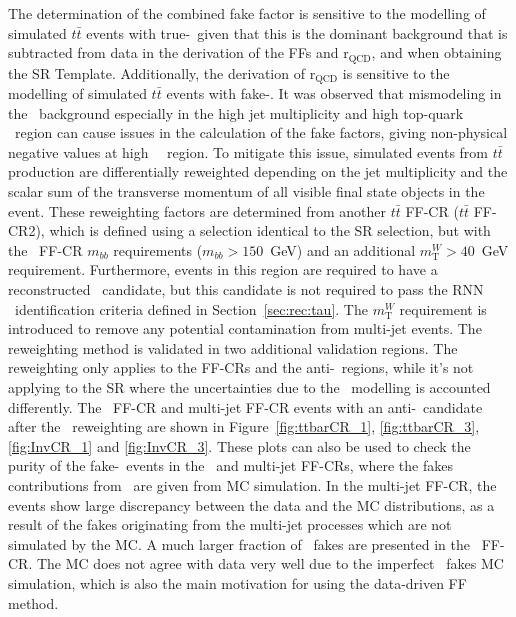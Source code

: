 The determination of the combined fake factor 
is sensitive to the modelling of simulated $t\bar{t}$ events with true-\tauhad\
given that this is the dominant background that is subtracted from data in the derivation of
the FFs and $\mathrm{r}_\text{QCD}$, and when obtaining the SR Template. Additionally, the derivation
of $\mathrm{r}_\text{QCD}$ is sensitive to the modelling of simulated $t\bar{t}$ events with fake-\tauhad.
It was observed that mismodeling in the \ttbar\ background 
especially in the high jet multiplicity and high top-quark \pt\ region
can cause issues in the calculation of the fake factors, 
giving non-physical negative values at high \tauhad\ \pt\ region. 
To mitigate this issue,
simulated events from $t\bar{t}$ production are differentially reweighted
depending on the jet multiplicity and the scalar sum of the transverse momentum of all visible
final state objects in the event.
These reweighting factors are determined from another $t\bar{t}$ FF-CR ($t\bar{t}$ FF-CR2),
which is defined using a selection identical to the SR selection,
but with the \ttbar\ FF-CR $m_{bb}$ requirements ($m_{bb}>150$~GeV)
and an additional $m^{W}_\text{T}>40$~GeV requirement. 
Furthermore, events in this region are required
to have a reconstructed \tauhad\ candidate, but this candidate is not required
to pass the RNN \tauhad\ identification criteria defined in Section~\ref{sec:rec:tau}.
The $m^{W}_\text{T}$ requirement is introduced to remove any potential contamination from multi-jet events.
The reweighting method is validated in two additional validation regions.
The reweighting only applies to the FF-CRs and the anti-\tauhad\ regions, 
while it's not applying to the SR 
where the uncertainties due to the \ttbar\ modelling is accounted differently.   
The \ttbar\ FF-CR and multi-jet FF-CR events with an anti-\tauhad\ candidate after the \ttbar\ reweighting 
are shown in Figure~\ref{fig:ttbarCR_1}, \ref{fig:ttbarCR_3}, \ref{fig:InvCR_1} and \ref{fig:InvCR_3}.
These plots can also be used to check the purity of the fake-\tauhad\ events in the \ttbar\ and multi-jet FF-CRs,  
where the fakes contributions from \ttbar\ are given from MC simulation.
In the multi-jet FF-CR, the events show large discrepancy between the
data and the MC distributions, as a result of the fakes originating from the 
multi-jet processes which are not simulated by the MC. 
A much larger fraction of \ttbar\ fakes are presented in the \ttbar\ FF-CR. 
The MC does not agree with data very well due to the imperfect \ttbar\ fakes MC simulation,
which is also the main motivation for using the data-driven FF method. 

